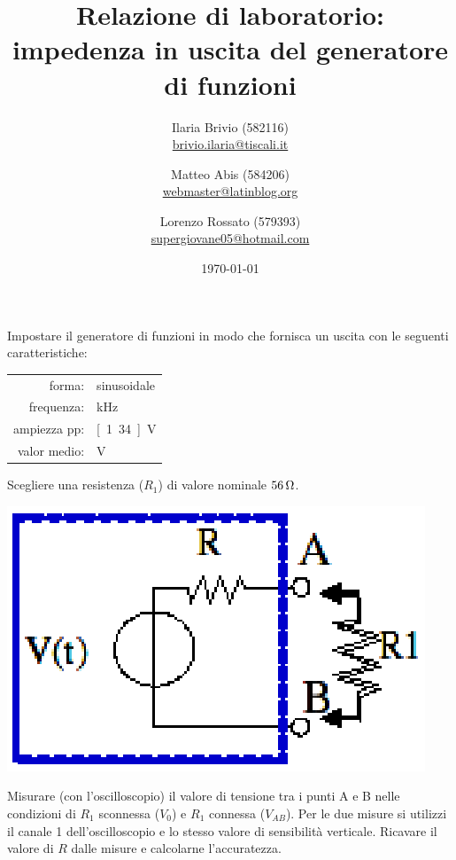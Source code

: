 \documentclass[italian,a4paper]{article}
\begin{document}
\title{Relazione di laboratorio: impedenza in uscita del generatore di funzioni}
\author{\normalsize Ilaria Brivio (582116)\\%
\normalsize \url{brivio.ilaria@tiscali.it}%
\and %
\normalsize Matteo Abis (584206)\\ %
\normalsize \url{webmaster@latinblog.org}
\and %
\normalsize Lorenzo Rossato (579393)\\ %
\normalsize \url{supergiovane05@hotmail.com}}
\date{\today}
\maketitle
\thispagestyle{empty}
\noindent Impostare il generatore di funzioni in modo che fornisca un uscita
con le seguenti caratteristiche:
\begin{table}[h]
    \centering
    \begin{tabular}{rl}
        forma: & sinusoidale\\
        frequenza: & \unit[20]{kHz}\\
        ampiezza pp: & \unit[1.34]{V}\\
        valor medio: & \unit[0]{V}
    \end{tabular}
\end{table}
Scegliere una resistenza ($R_1$) di valore nominale $\unit[56]{\ohm}$. 
\begin{center}
 \includegraphics[height=5\baselineskip]{circuito1.eps}
\end{center}
Misurare (con l’oscilloscopio) il valore di tensione tra i punti A e B nelle condizioni di $R_1$ sconnessa
($V_0$) e $R_1$ connessa ($V_{AB}$). Per le due misure si utilizzi il canale 1 dell’oscilloscopio e lo stesso
valore di sensibilità verticale. Ricavare il valore di $R$ dalle misure e calcolarne l’accuratezza. 
\end{document}
